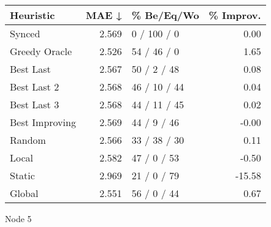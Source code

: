 \begin{tabular}{lrlr}
\toprule
\textbf{Heuristic} & \textbf{MAE ↓} & \textbf{\% Be/Eq/Wo} & \textbf{\% Improv.} \\
\midrule
            Synced &          2.569 &          0 / 100 / 0 &                0.00 \\
     Greedy Oracle &          2.526 &          54 / 46 / 0 &                1.65 \\
         Best Last &          2.567 &          50 / 2 / 48 &                0.08 \\
       Best Last 2 &          2.568 &         46 / 10 / 44 &                0.04 \\
       Best Last 3 &          2.568 &         44 / 11 / 45 &                0.02 \\
    Best Improving &          2.569 &          44 / 9 / 46 &               -0.00 \\
            Random &          2.566 &         33 / 38 / 30 &                0.11 \\
             Local &          2.582 &          47 / 0 / 53 &               -0.50 \\
            Static &          2.969 &          21 / 0 / 79 &              -15.58 \\
            Global &          2.551 &          56 / 0 / 44 &                0.67 \\
\bottomrule
\end{tabular}
\caption{Node 5}
\label{tab:hr_iid_lr01_le1_bs2_5}
